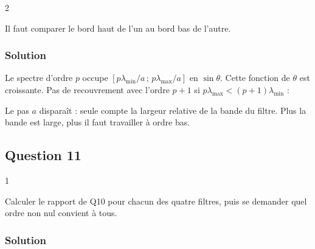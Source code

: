 \documentclass[11pt,a4paper]{article}
\newcommand{\equationajustee}[1]{%
  \sbox{\boiteequation}{$\displaystyle #1$}%
  \ifdim\wd\boiteequation>\linewidth
    \[\resizebox{\linewidth}{!}{\usebox{\boiteequation}}\]%
  \else
    \[#1\]%
  \fi}
\begin{document}
\begin{indication}{2}

Il faut comparer le bord haut de l'un au bord bas de l'autre.

\end{indication}

\hypertarget{solution-9}{%
\subsubsection{Solution}\label{solution-9}}

Le spectre d'ordre \(p\) occupe \([p\lambda_{\min}/a\,;\,p\lambda_{\max}/a]\) en \(\sin\theta\). Cette fonction de \(\theta\) est croissante. Pas de recouvrement avec l'ordre \(p+1\) si \(p\lambda_{\max}<(p+1)\lambda_{\min}\) :

\equationajustee{\boxed{p<\frac{\lambda_{\min}}{\lambda_{\max}-\lambda_{\min}}}}

\begin{methode}

Le pas \(a\) disparaît : seule compte la largeur relative de la bande du filtre. Plus la bande est large, plus il faut travailler à ordre bas.

\end{methode}

\hypertarget{question-11}{%
\subsection{Question 11}\label{question-11}}

\begin{indication}{1}

Calculer le rapport de Q10 pour chacun des quatre filtres, puis se demander quel ordre non nul convient à tous.

\end{indication}

\hypertarget{solution-10}{%
\subsubsection{Solution}\label{solution-10}}
\end{document}
